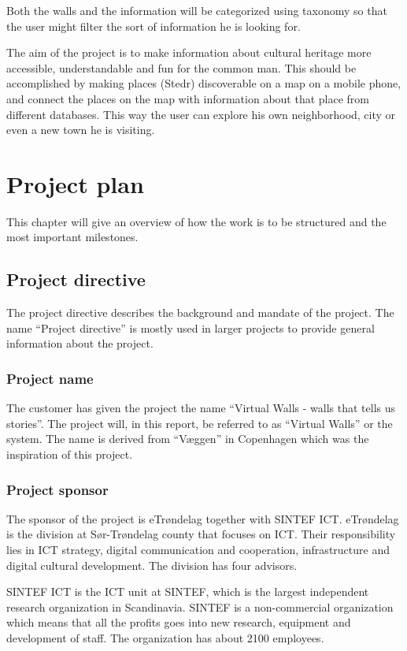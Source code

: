 \documentclass[11pt]{book}
\begin{document}
Both the walls and the information will be categorized using taxonomy so that the user might filter the sort of information he is looking for.

The aim of the project is to make information about cultural heritage more accessible, understandable and fun for the common man. This should be accomplished by making places (Stedr) discoverable on a map on a mobile phone, and connect the places on the map with information about that place from different databases. This way the user can explore his own neighborhood, city or even a new town he is visiting.

\chapter{Project plan}
\label{chap:project_plan}
This chapter will give an overview of how the work is to be structured and the most important milestones.

\section{Project directive}
The project directive describes the background and mandate of the project. The name ``Project directive'' is mostly used in larger projects to provide general information about the project.

\subsection{Project name}
The customer has given the project the name ``Virtual Walls - walls that tells us stories''. The project will, in this report, be referred to as ``Virtual Walls'' or the system. The name is derived from ``Væggen'' in Copenhagen which was the inspiration of this project.

\subsection{Project sponsor}
The sponsor of the project is eTrøndelag together with SINTEF ICT.
eTrøndelag is the division at Sør-Trøndelag county that focuses on ICT. Their responsibility lies in ICT strategy, digital communication and cooperation, infrastructure and digital cultural development. The division has four advisors.

SINTEF ICT is the ICT unit at SINTEF, which is the largest independent research organization in Scandinavia. SINTEF is a non-commercial organization which means that all the profits goes into new research, equipment and development of staff. The organization has about 2100 employees.
\end{document}
